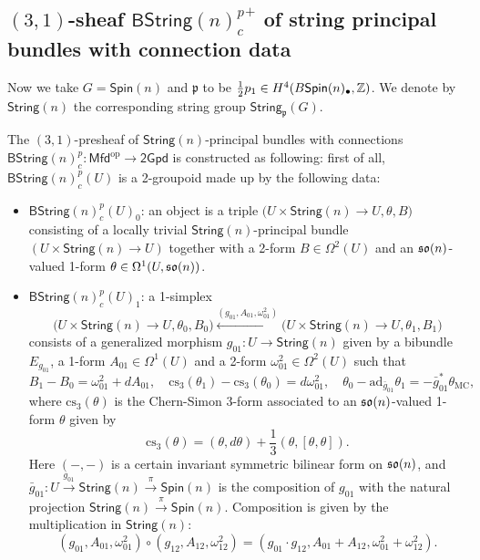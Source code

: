 \documentclass[letterpaper,10pt, oneside]{article} %
\newcommand{\Mfd}{\mathsf{Mfd}}%
\newcommand{\tGpd}{\mathsf{2Gpd}}%
\newcommand{\bstringnp}{\mathsf{BString}(n)^p_{c}} %
\newcommand{\bstringnpp}{{\mathsf{BString}(n)^p_{c}}^+} %
\newcommand{\String}{\mathsf{String}}%
\newcommand{\Spin}{\mathsf{Spin}}%
\newcommand{\op}{\mathrm{op}}%
\newcommand{\cs}{\mathrm{cs}}
\newcommand{\TM}{\theta_{\scriptscriptstyle \mathrm{MC}}}
\newcommand{\frkp}{\mathfrak p}
\newcommand{\half}{\frac{1}{2}}
\newcommand{\pp}{\frkp} %
\newcommand{\ad}{\mathrm{ad}}
\begin{document}


\subsection{$(3,1)$-sheaf $\bstringnpp$ of string principal bundles with connection data}
Now we take $G=\Spin(n)$ and  $\pp$ to be $\half p_1 \in H^4(B\Spin(n)_\bullet, \Z)$. We denote by $\String(n)$ the corresponding string group $\String_\pp(G)$.

The $(3,1)$-presheaf of $\String(n)$-principal bundles with connections
$\bstringnp: \Mfd^{\op} \to \tGpd$ is constructed as following: first of
all, $\bstringnp(U)$ is a 2-groupoid made up by the following data:
\begin{itemize}
\item{$\bstringnp(U)_0$}:  an object is a triple $\big( U\times \String(n)\to U, \theta, B \big) $ consisting
 of a locally  trivial $\String(n)$-principal bundle $(U\times \String(n)\to U)$
  together with a 2-form $B\in\Omega^2(U) $ and an $\mathfrak{so}(n)$-valued 1-form
  $\theta \in \Omega^1(U, \mathfrak{so}(n))$.
\item{$\bstringnp(U)_1$}: a 1-simplex  \[\big( U\times \String(n)\to U,
  \theta_0, B_0 \big) \xleftarrow{(g_{\scriptscriptstyle 01}, A_{\scriptscriptstyle 01}, \omega^2_{\scriptscriptstyle 01})} \big( U\times \String(n)\to U,
  \theta_1, B_1 \big)  \] consists of a generalized morphism $g_{\scriptscriptstyle 01}: U\to \String(n)$ given by
  a bibundle $E_{g_{\scriptscriptstyle 01}}$,  a 1-form $A_{\scriptscriptstyle 01}\in \Omega^1(U)$  and a 2-form
  $\omega^2_{\scriptscriptstyle 01} \in \Omega^2(U)$ such that
\[
B_1-B_0=\omega^2_{\scriptscriptstyle 01} +dA_{\scriptscriptstyle 01}, \quad
\cs_3(\theta_1)-\cs_3(\theta_0) =d\omega^2_{\scriptscriptstyle 01}, \quad \theta_0 -
\ad_{\bar{g}_{\scriptscriptstyle 01}} \theta_1 = -\bar{g}^*_{\scriptscriptstyle 01}\TM,
\]  where $\cs_3(\theta)$ is the Chern-Simon 3-form associated to an $\mathfrak{so}(n)$-valued 1-form $\theta$  given by
\begin{equation}\label{eq:cs3-form}
 \cs_3(\theta)=(\theta,d\theta)+\frac{1}{3}(\theta,[\theta,\theta]).
\end{equation}
Here $(-,-)$ is a certain invariant symmetric bilinear form on $\mathfrak{so}(n)$,  and $\bar{g}_{\scriptscriptstyle 01}
: U\xrightarrow{g_{\scriptscriptstyle 01}} \String(n) \xrightarrow{\pi} \Spin(n)$ is the composition
of $g_{\scriptscriptstyle 01}$ with the natural projection $\String(n)\xrightarrow{\pi} \Spin(n)$. Composition
is given by the multiplication in $\String(n)$:
\[
(g_{\scriptscriptstyle 01}, A_{\scriptscriptstyle 01}, \omega^2_{\scriptscriptstyle 01}) \circ (g_{\scriptscriptstyle 12}, A_{\scriptscriptstyle 12},
\omega^2_{\scriptscriptstyle 12}) = (g_{\scriptscriptstyle 01} \cdot g_{\scriptscriptstyle 12}, A_{\scriptscriptstyle 01}+A_{\scriptscriptstyle 12},
\omega^2_{\scriptscriptstyle 01}+ \omega^2_{\scriptscriptstyle 12}).
\]


\end{itemize}
\end{document}
